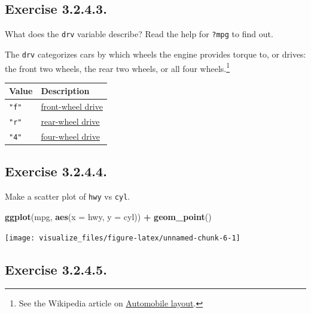 \documentclass[]{book}
\newenvironment{Shaded}{\begin{snugshade}}{\end{snugshade}}
\newcommand{\DataTypeTok}[1]{\textcolor[rgb]{0.13,0.29,0.53}{#1}}
\newcommand{\KeywordTok}[1]{\textcolor[rgb]{0.13,0.29,0.53}{\textbf{#1}}}
\newcommand{\NormalTok}[1]{#1}
\newcommand{\OperatorTok}[1]{\textcolor[rgb]{0.81,0.36,0.00}{\textbf{#1}}}
\newcommand{\StringTok}[1]{\textcolor[rgb]{0.31,0.60,0.02}{#1}}
\let\rmarkdownfootnote\footnote%
\def\footnote{\protect\rmarkdownfootnote}
\theoremstyle{plain}
\theoremstyle{remark}
\begin{document}
\hypertarget{exercise-3.2.4.3.}{%
\subsection*{\texorpdfstring{Exercise {3.2.4.3}.}{Exercise 3.2.4.3.}}\label{exercise-3.2.4.3.}}

What does the \texttt{drv} variable describe? Read the help for \texttt{?mpg} to find out.

The \texttt{drv} categorizes cars by which wheels the engine provides torque to, or drives: the front two wheels, the rear two wheels, or all four wheels.\footnote{See the Wikipedia article on \href{https://en.wikipedia.org/wiki/Automobile_layout}{Automobile layout}.}

\begin{longtable}[]{@{}ll@{}}
\toprule
Value & Description\tabularnewline
\midrule
\endhead
\texttt{"f"} & \href{https://en.wikipedia.org/wiki/Front-wheel_drive}{front-wheel drive}\tabularnewline
\texttt{"r"} & \href{https://en.wikipedia.org/wiki/Automobile_layout\#Rear-wheel-drive_layouts}{rear-wheel drive}\tabularnewline
\texttt{"4"} & \href{https://en.wikipedia.org/wiki/Four-wheel_drive}{four-wheel drive}\tabularnewline
\bottomrule
\end{longtable}

\hypertarget{exercise-3.2.4.4.}{%
\subsection*{\texorpdfstring{Exercise {3.2.4.4}.}{Exercise 3.2.4.4.}}\label{exercise-3.2.4.4.}}

Make a scatter plot of \texttt{hwy} vs \texttt{cyl}.

\begin{Shaded}
\begin{Highlighting}[]
\KeywordTok{ggplot}\NormalTok{(mpg, }\KeywordTok{aes}\NormalTok{(}\DataTypeTok{x =}\NormalTok{ hwy, }\DataTypeTok{y =}\NormalTok{ cyl)) }\OperatorTok{+}
\StringTok{  }\KeywordTok{geom_point}\NormalTok{()}
\end{Highlighting}
\end{Shaded}

\begin{center}\texttt{[image: visualize\_files/figure-latex/unnamed-chunk-6-1]} \end{center}

\hypertarget{exercise-3.2.4.5.}{%
\subsection*{\texorpdfstring{Exercise {3.2.4.5}.}{Exercise 3.2.4.5.}}\label{exercise-3.2.4.5.}}
\end{document}
